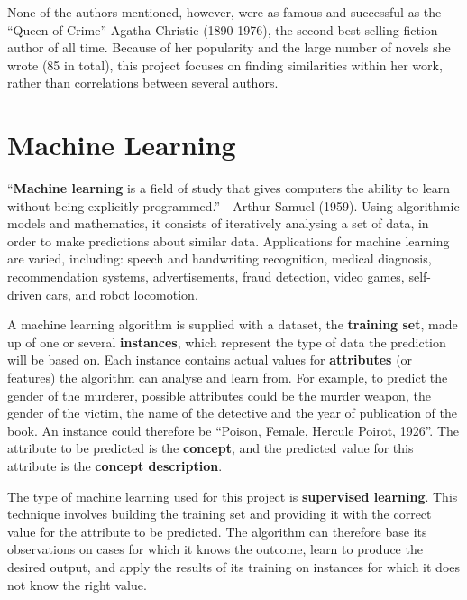 \documentclass{mproj}
\begin{document}
None of the authors mentioned, however, were as famous and successful as the ``Queen of Crime'' Agatha Christie (1890-1976), the second best-selling fiction author of all time. \cite{bestseller} Because of her popularity and the large number of novels she wrote (85 in total), this project focuses on finding similarities within her work, rather than correlations between several authors.

\section{Machine Learning}\label{machine_learning}
``\textbf{Machine learning} is a field of study that gives computers the ability to learn without being explicitly programmed.'' - Arthur Samuel (1959). \cite[Chapter~3]{quotearthursamuel} Using algorithmic models and mathematics, it consists of iteratively analysing a set of data, in order to make predictions about similar data. Applications for machine learning are varied, including: speech and handwriting recognition, medical diagnosis, recommendation systems, advertisements, fraud detection, video games, self-driven cars, and robot locomotion. \par 

A machine learning algorithm is supplied with a dataset, the \textbf{training set}, made up of one or several \textbf{instances}, which represent the type of data the prediction will be based on. Each instance contains actual values for \textbf{attributes} (or features) the algorithm can analyse and learn from. \cite[Chapter~2]{wekabook} For example, to predict the gender of the murderer, possible attributes could be the murder weapon, the gender of the victim, the name of the detective and the year of publication of the book. An instance could therefore be ``Poison, Female, Hercule Poirot, 1926''. The attribute to be predicted is the \textbf{concept}, and the predicted value for this attribute is the \textbf{concept description}. \par 

The type of machine learning used for this project is \textbf{supervised learning}. This technique involves building the training set and providing it with the correct value for the attribute to be predicted. \cite{machinelearningcourse} The algorithm can therefore base its observations on cases for which it knows the outcome, learn to produce the desired output, and apply the results of its training on instances for which it does not know the right value. \par
\end{document}
